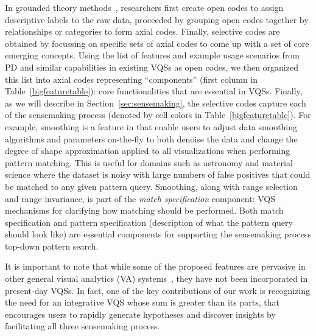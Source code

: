 {  \par In grounded theory methods~\cite{Muller2012}, researchers first create open codes to assign descriptive labels to the raw data, proceeded by grouping open codes together by relationships or categories to form axial codes. Finally, selective codes are obtained by focussing on specific sets of axial codes to come up with a set of core emerging concepts. Using the list of features and example usage scenarios from PD and similar capabilities in existing VQSs as open codes, we then organized this list into axial codes representing ``components'' (first column in Table~\ref{bigfeaturetable}): core functionalities that are essential in VQSs. Finally, as we will describe in Section~\ref{sec:sensemaking}, the selective codes capture each of the sensemaking process (denoted by cell colors in Table~\ref{bigfeaturetable}). For example, smoothing is a feature in \zvpp that enable users to adjust data smoothing algorithms and parameters on-the-fly to both denoise the data and change the degree of shape approximation applied to all visualizations when performing pattern matching. This is useful for domains such as astronomy and material science where the dataset is noisy with large numbers of false positives that could be matched to any given pattern query. Smoothing, along with range selection and range invariance, is part of the \emph{match specification} component: VQS mechanisms for clarifying how matching should be performed. Both match specification and pattern specification (description of what the pattern query should look like) are essential components for supporting the sensemaking process top-down pattern search.
  \par It is important to note that while some of the proposed features are pervasive in other general visual analytics (VA) systems~\cite{Heer2012,Amar2005}, they have not been incorporated in present-day VQSs. In fact, one of the key contributions of our work is recognizing the need for an integrative VQS whose sum is greater than its parts, that encourages users to rapidly generate hypotheses and discover insights by facilitating all three sensemaking process.
}
